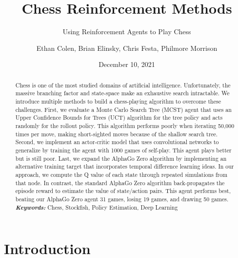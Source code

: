 \documentclass[12pt]{turabian-researchpaper}
\title{Chess Reinforcement Methods}
\subtitle{Using Reinforcement Agents to Play Chess}
\author{Ethan Colen, Brian Elinsky, Chris Festa, Philmore Morrison}
\date{December 10, 2021}
\providecommand{\keywords}[1]{\textbf{\textit{Keywords:}} #1}
\begin{document}
\maketitle

\begin{abstract}
    \noindent
    Chess is one of the most studied domains of artificial intelligence. Unfortunately, the massive branching factor and state-space make an exhaustive search intractable. We introduce multiple methods to build a chess-playing algorithm to overcome these challenges. First, we evaluate a Monte Carlo Search Tree (MCST) agent that uses an Upper Confidence Bounds for Trees (UCT) algorithm for the tree policy and acts randomly for the rollout policy. This algorithm performs poorly when iterating 50,000 times per move, making short-sighted moves because of the shallow search tree. Second, we implement an actor-critic model that uses convolutional networks to generalize by training the agent with 1000 games of self-play. This agent plays better but is still poor. Last, we expand the AlphaGo Zero algorithm by implementing an alternative training target that incorporates temporal difference learning ideas. In our approach, we compute the Q value of each state through repeated simulations from that node. In contrast, the standard AlphaGo Zero algorithm back-propagates the episode reward to estimate the value of state/action pairs. This agent performs best, beating our AlphaGo Zero agent 31 games, losing 19 games, and drawing 50 games. \\
\noindent\keywords{Chess, Stockfish, Policy Estimation, Deep Learning}
\end{abstract}

\section*{Introduction}

\end{document}
